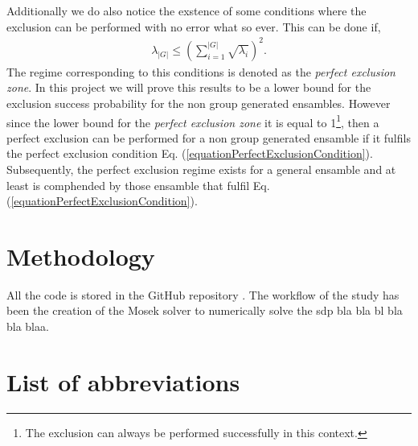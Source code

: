 \documentclass[12pt,letterpaper]{article}
\begin{document}
\begin{multicols}{2}
Additionally we do also notice the exstence of some conditions where the exclusion can be performed with no error what so ever. This can be done if,
\begin{align}\label{equationPerfectExclusionCondition}
	\lambda_{|G|}\leq \left(\sum_{i=1}^{|G|}\sqrt{\lambda_i}\right)^2.
\end{align}
The regime corresponding to this conditions is denoted as the \emph{perfect exclusion zone}. In this project we will prove this results to be a lower bound for the exclusion success probability for the non group generated ensambles. However since the lower bound for the \emph{perfect exclusion zone} it is equal to 1\footnote{The exclusion can always be performed successfully in this context.}, then a perfect exclusion can be performed for a non group generated ensamble if it fulfils the perfect exclusion condition Eq. (\ref{equationPerfectExclusionCondition}). Subsequently, the perfect exclusion regime exists for a general ensamble and at least is comphended by those ensamble that fulfil Eq. (\ref{equationPerfectExclusionCondition}).

\section{Methodology}
All the code is stored in the GitHub repository \cite{GitHub}. The workflow of the study has been the creation of the Mosek solver \cite{mosek_sdp} to numerically solve the \gls{sdp} bla bla bl bla bla blaa.



 
\section*{List of abbreviations}
\renewcommand{\glsnamefont}[1]{\textbf{#1}}
\printnoidxglossary[type=main, title={\vspace{-1cm}}, nonumberlist, nogroupskip, style=super]


\end{multicols}
\end{document}
